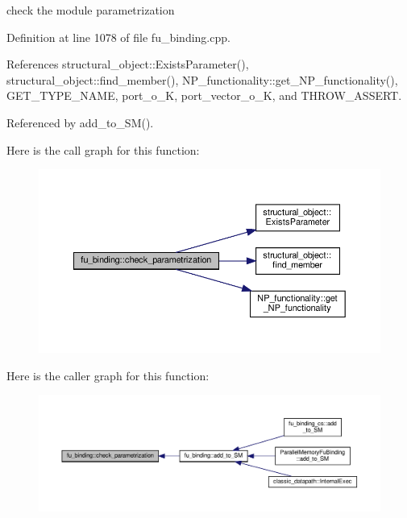 check the module parametrization 



Definition at line 1078 of file fu\+\_\+binding.\+cpp.



References structural\+\_\+object\+::\+Exists\+Parameter(), structural\+\_\+object\+::find\+\_\+member(), N\+P\+\_\+functionality\+::get\+\_\+\+N\+P\+\_\+functionality(), G\+E\+T\+\_\+\+T\+Y\+P\+E\+\_\+\+N\+A\+ME, port\+\_\+o\+\_\+K, port\+\_\+vector\+\_\+o\+\_\+K, and T\+H\+R\+O\+W\+\_\+\+A\+S\+S\+E\+RT.



Referenced by add\+\_\+to\+\_\+\+S\+M().

Here is the call graph for this function\+:
\nopagebreak
\begin{figure}[H]
\begin{center}
\leavevmode
\includegraphics[width=350pt]{d8/d04/classfu__binding_acbc4082d95a97e8ce9ca88a46a72999e_cgraph}
\end{center}
\end{figure}
Here is the caller graph for this function\+:
\nopagebreak
\begin{figure}[H]
\begin{center}
\leavevmode
\includegraphics[width=350pt]{d8/d04/classfu__binding_acbc4082d95a97e8ce9ca88a46a72999e_icgraph}
\end{center}
\end{figure}
\mbox{\label{classfu__binding_a81b205a4f6b735fcd971cf3315c85e14}} 
